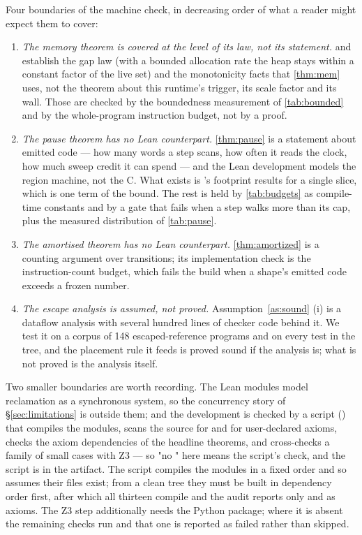 Four boundaries of the machine check, in decreasing order of what a reader might expect them to cover:
\begin{enumerate}
\item \emph{The memory theorem is covered at the level of its law, not its statement.}
 and  establish the gap law (with a bounded allocation rate the heap
stays within a constant factor of the live set) and the monotonicity facts that
\thm\ref{thm:mem} uses, not the theorem about this runtime's trigger, its scale factor and its
wall.  Those are checked by the boundedness measurement of \tab\ref{tab:bounded} and by the
whole-program instruction budget, not by a proof.
\item \emph{The pause theorem has no Lean counterpart.}  \thm\ref{thm:pause} is a statement about
emitted code — how many words a step scans, how often it reads the clock, how much sweep credit it
can spend — and the Lean development models the region machine, not the C.  What exists is
's footprint results for a single slice, which is one term of the bound.  The
rest is held by \tab\ref{tab:budgets} as compile-time constants and by a gate that fails when a step
walks more than its cap, plus the measured distribution of \tab\ref{tab:pause}.
\item \emph{The amortised theorem has no Lean counterpart.}  \thm\ref{thm:amortized} is a counting
argument over transitions; its implementation check is the instruction-count budget, which fails the
build when a shape's emitted code exceeds a frozen number.
\item \emph{The escape analysis is assumed, not proved.}  Assumption~\ref{as:sound} (i) is a
dataflow analysis with several hundred lines of checker code behind it.  We test it on a corpus of
148 escaped-reference programs and on every test in the tree, and the placement rule it feeds is
proved sound if the analysis is; what is not proved is the analysis itself.
\end{enumerate}
Two smaller boundaries are worth recording.  The Lean modules model reclamation as a synchronous
system, so the concurrency story of \S\ref{sec:limitations} is outside them; and the development is
checked by a script () that compiles the modules, scans the source for
 and for user-declared axioms, checks the axiom dependencies of the headline theorems,
and cross-checks a family of small cases with Z3 — so "no " here means the script's
check, and the script is in the artifact.  The script compiles the modules in a fixed order and so
assumes their  files exist; from a clean tree they must be built in dependency order
first, after which all thirteen compile and the audit reports only  and
 as axioms.  The Z3 step additionally needs the  Python package;
where it is absent the remaining checks run and that one is reported as failed rather than skipped.

